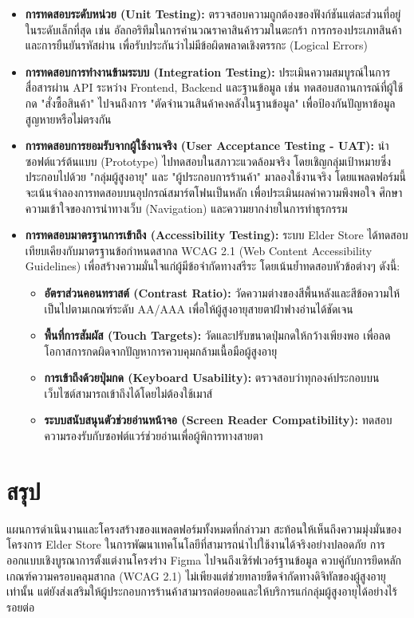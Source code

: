 \begin{itemize}
  \item \textbf{การทดสอบระดับหน่วย (Unit Testing):}  
  ตรวจสอบความถูกต้องของฟังก์ชันแต่ละส่วนที่อยู่ในระดับเล็กที่สุด เช่น อัลกอริทึมในการคำนวณราคาสินค้ารวมในตะกร้า การกรองประเภทสินค้า และการยืนยันรหัสผ่าน เพื่อรับประกันว่าไม่มีข้อผิดพลาดเชิงตรรกะ (Logical Errors)

  \item \textbf{การทดสอบการทำงานข้ามระบบ (Integration Testing):}  
  ประเมินความสมบูรณ์ในการสื่อสารผ่าน API ระหว่าง Frontend, Backend และฐานข้อมูล เช่น ทดสอบสถานการณ์ที่ผู้ใช้กด "สั่งซื้อสินค้า" ไปจนถึงการ "ตัดจำนวนสินค้าคงคลังในฐานข้อมูล" เพื่อป้องกันปัญหาข้อมูลสูญหายหรือไม่ตรงกัน

  \item \textbf{การทดสอบการยอมรับจากผู้ใช้งานจริง (User Acceptance Testing - UAT):}  
  นำซอฟต์แวร์ต้นแบบ (Prototype) ไปทดสอบในสภาวะแวดล้อมจริง โดยเชิญกลุ่มเป้าหมายซึ่งประกอบไปด้วย "กลุ่มผู้สูงอายุ" และ "ผู้ประกอบการร้านค้า" มาลองใช้งานจริง โดยแพลตฟอร์มนี้จะเน้นจำลองการทดสอบบนอุปกรณ์สมาร์ตโฟนเป็นหลัก เพื่อประเมินผลค่าความพึงพอใจ ศึกษาความเข้าใจของการนำทางเว็บ (Navigation) และความยากง่ายในการทำธุรกรรม

  \item \textbf{การทดสอบมาตรฐานการเข้าถึง (Accessibility Testing):}  
  ระบบ Elder Store ได้ทดสอบเทียบเคียงกับมาตรฐานข้อกำหนดสากล WCAG 2.1 (Web Content Accessibility Guidelines) เพื่อสร้างความมั่นใจแก่ผู้มีข้อจำกัดทางสรีระ โดยเน้นย้ำทดสอบหัวข้อต่างๆ ดังนี้:
  \begin{itemize}
      \item \textbf{อัตราส่วนคอนทราสต์ (Contrast Ratio):} วัดความต่างของสีพื้นหลังและสีข้อความให้เป็นไปตามเกณฑ์ระดับ AA/AAA เพื่อให้ผู้สูงอายุสายตาฝ้าฟางอ่านได้ชัดเจน
      \item \textbf{พื้นที่การสัมผัส (Touch Targets):} วัดและปรับขนาดปุ่มกดให้กว้างเพียงพอ เพื่อลดโอกาสการกดผิดจากปัญหาการควบคุมกล้ามเนื้อมือผู้สูงอายุ
      \item \textbf{การเข้าถึงด้วยปุ่มกด (Keyboard Usability):} ตรวจสอบว่าทุกองค์ประกอบบนเว็บไซต์สามารถเข้าถึงได้โดยไม่ต้องใช้เมาส์
      \item \textbf{ระบบสนับสนุนตัวช่วยอ่านหน้าจอ (Screen Reader Compatibility):} ทดสอบความรองรับกับซอฟต์แวร์ช่วยอ่านเพื่อผู้พิการทางสายตา
  \end{itemize}
\end{itemize}

\section{สรุป}
แผนการดำเนินงานและโครงสร้างของแพลตฟอร์มทั้งหมดที่กล่าวมา สะท้อนให้เห็นถึงความมุ่งมั่นของโครงการ Elder Store ในการพัฒนาเทคโนโลยีที่สามารถนำไปใช้งานได้จริงอย่างปลอดภัย \cite{ecommerce_reference_here} การออกแบบเชิงบูรณาการตั้งแต่งานโครงร่าง Figma ไปจนถึงเซิร์ฟเวอร์ฐานข้อมูล ควบคู่กับการยึดหลักเกณฑ์ความครอบคลุมสากล (WCAG 2.1) ไม่เพียงแต่ช่วยทลายขีดจำกัดทางดิจิทัลของผู้สูงอายุเท่านั้น แต่ยังส่งเสริมให้ผู้ประกอบการร้านค้าสามารถต่อยอดและให้บริการแก่กลุ่มผู้สูงอายุได้อย่างไร้รอยต่อ
